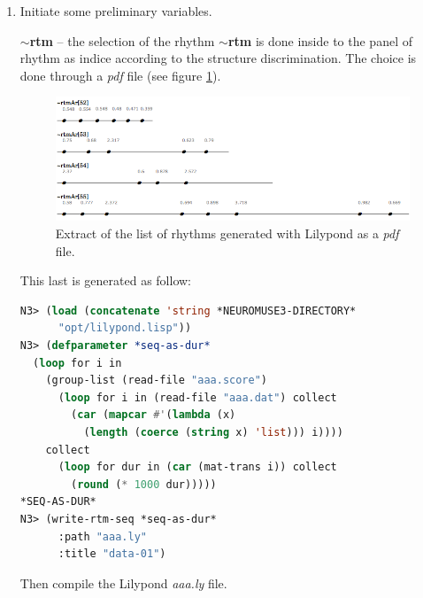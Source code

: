 \begin{enumerate}
 \item Initiate some preliminary variables.


\textbf{$\sim$rtm} -- the selection of the rhythm \textbf{$\sim$rtm} is done inside to the panel of rhythm as indice according to the structure discrimination. The choice is done through a \textsl{pdf} file (see figure \ref{rtm}). 

\bigskip 

 \begin{figure}[htbp]
\begin{center}
\includegraphics[scale=0.44]{img/6710} 
\caption{Extract of the list of rhythms generated with Lilypond as a \textsl{pdf} file.}
\label{rtm}
\end{center}
\end{figure}
 
This last is generated as follow:
 \begin{lstlisting}[basicstyle=\footnotesize\ttfamily,language=Lisp]
N3> (load (concatenate 'string *NEUROMUSE3-DIRECTORY* 
      "opt/lilypond.lisp"))
N3> (defparameter *seq-as-dur* 
  (loop for i in 
    (group-list (read-file "aaa.score") 
      (loop for i in (read-file "aaa.dat") collect 
        (car (mapcar #'(lambda (x) 
          (length (coerce (string x) 'list))) i)))) 
    collect 
      (loop for dur in (car (mat-trans i)) collect 
        (round (* 1000 dur)))))
*SEQ-AS-DUR*
N3> (write-rtm-seq *seq-as-dur* 
      :path "aaa.ly" 
      :title "data-01")
\end{lstlisting}
Then compile the Lilypond \textsl{aaa.ly} file.%


\end{enumerate}
